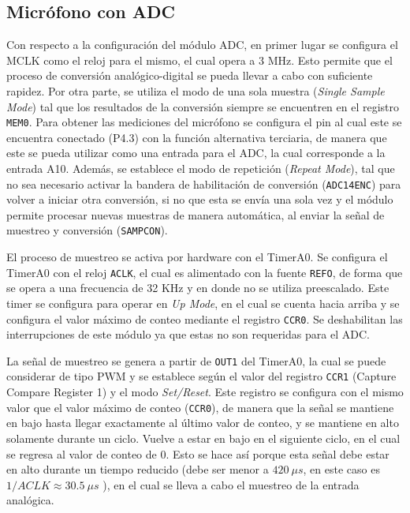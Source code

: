 \subsection{Micrófono con ADC}
Con respecto a la configuración del módulo ADC, en primer lugar se configura el MCLK como el reloj
para el mismo, el cual opera a 3 MHz. Esto permite que el proceso de conversión analógico-digital se
pueda llevar a cabo con suficiente rapidez. Por otra parte, se utiliza el modo de una sola muestra
(\textit{Single Sample Mode}) tal que los resultados de la conversión siempre se encuentren en el
registro \texttt{MEM0}. Para obtener las mediciones del micrófono se configura el pin al cual este
se encuentra conectado (P4.3) con la función alternativa terciaria, de manera que este se pueda
utilizar como una entrada para el ADC, la cual corresponde a la entrada A10. Además, se establece el
modo de repetición (\textit{Repeat Mode}), tal que no sea necesario activar la bandera de
habilitación de conversión (\texttt{ADC14ENC}) para volver a iniciar otra conversión, si no que esta
se envía una sola vez y el módulo permite procesar nuevas muestras de manera automática, al enviar la
señal de muestreo y conversión (\texttt{SAMPCON}).

El proceso de muestreo se activa por hardware con el TimerA0. Se configura el TimerA0 con el reloj
\texttt{ACLK}, el cual es alimentado con la fuente \texttt{REFO}, de forma que se opera a una
frecuencia de 32 KHz y en donde no se utiliza preescalado. Este timer se configura para operar en
\textit{Up Mode}, en el cual se cuenta hacia arriba y se configura el valor máximo de conteo
mediante el registro \texttt{CCR0}. Se deshabilitan las interrupciones de este módulo ya que estas
no son requeridas para el ADC.

La señal de muestreo se genera a partir de \texttt{OUT1} del TimerA0, la cual se puede considerar de
tipo PWM y se establece según el valor del registro \texttt{CCR1} (Capture Compare Register 1) y el
modo \textit{Set/Reset}. Este registro se configura con el mismo valor que el valor máximo de conteo
(\texttt{CCR0}), de manera que la señal se mantiene en bajo hasta llegar exactamente al último valor
de conteo, y se mantiene en alto solamente durante un ciclo. Vuelve a estar en bajo en el siguiente
ciclo, en el cual se regresa al valor de conteo de 0. Esto se hace así porque esta señal debe estar
en alto durante un tiempo reducido (debe ser menor a $420~\mu s$, en este caso es
$1/ACLK \approx 30.5~\mu s$ ), en el cual se lleva a cabo el muestreo de la entrada analógica.

